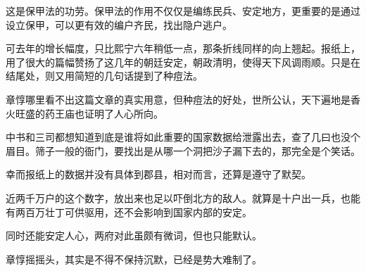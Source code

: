 这是保甲法的功劳。保甲法的作用不仅仅是编练民兵、安定地方，更重要的是通过设立保甲，可以更有效的编户齐民，找出隐户逃户。

可去年的增长幅度，只比熙宁六年稍低一点，那条折线同样的向上翘起。报纸上，用了很大的篇幅赞扬了这几年的朝廷安定，朝政清明，使得天下风调雨顺。只是在结尾处，则又用简短的几句话提到了种痘法。

章惇哪里看不出这篇文章的真实用意，但种痘法的好处，世所公认，天下遍地是香火旺盛的药王庙也证明了人心所向。

中书和三司都想知道到底是谁将如此重要的国家数据给泄露出去，查了几曰也没个眉目。筛子一般的衙门，要找出是从哪一个洞把沙子漏下去的，那完全是个笑话。

幸而报纸上的数据并没有具体到郡县，相对而言，还算是遵守了默契。

近两千万户的这个数字，放出来也足以吓倒北方的敌人。就算是十户出一兵，也能有两百万壮丁可供驱用，还不会影响到国家内部的安定。

同时还能安定人心，两府对此虽颇有微词，但也只能默认。

章惇摇摇头，其实是不得不保持沉默，已经是势大难制了。
